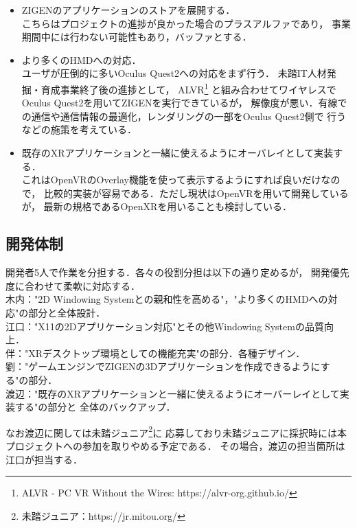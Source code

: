 \begin{itemize}
      \item ZIGENのアプリケーションのストアを展開する．\\
            こちらはプロジェクトの進捗が良かった場合のプラスアルファであり，
            事業期間中には行わない可能性もあり，バッファとする．

      \item より多くのHMDへの対応．\\
            ユーザが圧倒的に多いOculus Quest2への対応をまず行う．
            未踏IT人材発掘・育成事業終了後の進捗として，
            ALVR\footnote{ALVR - PC VR Without the Wires: https://alvr-org.github.io/}
            と組み合わせてワイヤレスでOculus Quest2を用いてZIGENを実行できているが，
            解像度が悪い．有線での通信や通信情報の最適化，レンダリングの一部をOculus Quest2側で
            行うなどの施策を考えている．

      \item 既存のXRアプリケーションと一緒に使えるようにオーバレイとして実装する．\\
            これはOpenVRのOverlay機能を使って表示するようにすれば良いだけなので，
            比較的実装が容易である．ただし現状はOpenVRを用いて開発しているが，
            最新の規格であるOpenXRを用いることも検討している．
\end{itemize}

\subsection{開発体制}

開発者5人で作業を分担する．各々の役割分担は以下の通り定めるが，
開発優先度に合わせて柔軟に対応する．\\
木内："2D Windowing Systemとの親和性を高める"，"より多くのHMDへの対応"の部分と全体設計．\\
江口："X11の2Dアプリケーション対応"とその他Windowing Systemの品質向上．\\
伴："XRデスクトップ環境としての機能充実"の部分．各種デザイン．\\
劉："ゲームエンジンでZIGENの3Dアプリケーションを作成できるようにする"の部分．\\
渡辺："既存のXRアプリケーションと一緒に使えるようにオーバーレイとして実装する"の部分と
全体のバックアップ．

なお渡辺に関しては未踏ジュニア\footnote{未踏ジュニア：https://jr.mitou.org/}に
応募しており未踏ジュニアに採択時には本プロジェクトへの参加を取りやめる予定である．
その場合，渡辺の担当箇所は江口が担当する．


